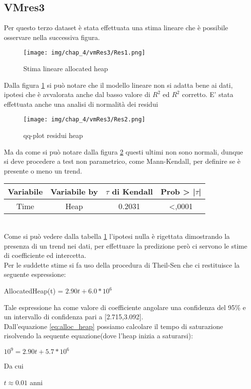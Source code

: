 \subsection{VMres3}
Per questo terzo dataset è stata effettuata una stima lineare che è possibile osservare nella successiva figura.
\begin{figure}[H]
    \centering
    \texttt{[image: img/chap\_4/vmRes3/Res1.png]}
    \caption{Stima lineare allocated heap}
    \label{fig:stim_lin_VmRes1}
\end{figure}
\noindent
Dalla figura \ref{fig:stim_lin_VmRes1} si può notare che il modello lineare non si adatta bene ai dati, ipotesi che è avvalorata anche dal basso valore di $R^2$ ed $R^2$ corretto.
E' stata effettuata anche una analisi di normalità dei residui
\begin{figure}[H]
    \centering
    \texttt{[image: img/chap\_4/vmRes3/Res2.png]}
    \caption{qq-plot residui heap}
    \label{fig:qq_plot_VmRes1}
\end{figure}
Ma da come si può notare dalla figura \ref{fig:qq_plot_VmRes1} questi ultimi non sono normali, dunque si deve procedere a test non parametrico, come Mann-Kendall, per definire se è presente o meno un trend.\\
\begin{table}[htbp]
    \centering
    \label{tab:Mann-kendall}
    \begin{tabular}{|c|c|c|c|} %
        \hline
        Variabile & Variabile by & $\tau$ di Kendall &Prob > |$\tau$| \\ %
        \hline
        Time & Heap & 0.2031 & <,0001\\
        \hline
    \end{tabular}
\end{table}
\\
Come si può vedere dalla tabella \ref{tab:Mann-kendall} l'ipotesi nulla è rigettata dimostrando la presenza di un trend nei dati, per effettuare la predizione però ci servono le stime di coefficiente ed intercetta.\\
Per le suddette stime si fa uso della procedura di Theil-Sen che ci restituisce la seguente espressione:
\begin{center}
   AllocatedHeap(t) = $2.90t + 6.0*10^6$
   \label{eq:alloc_heap}
\end{center}
Tale espressione ha come valore di coefficiente angolare una confidenza del 95\% e un intervallo di confidenza pari a [2.715,3.092].\\
Dall'equazione \ref{eq:alloc_heap} possiamo calcolare il tempo di saturazione risolvendo la sequente equazione(dove l'heap inizia a saturarsi):
\begin{center}
    $
    10^9 = 2.90t+5.7*10^6
    $\\
\end{center}
Da cui 
\begin{center}
    $
    t \approx 0.01$ anni
\end{center}